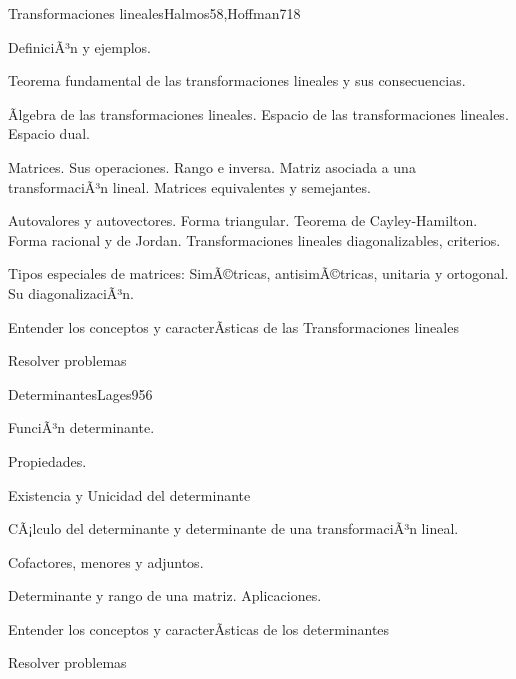 \begin{syllabus}
\begin{unit}{Transformaciones lineales}{Halmos58,Hoffman71}{8}
   \begin{topics}
         \item  DefiniciÃ³n y ejemplos.
	 \item  Teorema fundamental de las transformaciones lineales y sus consecuencias.
         \item  Ãlgebra de las transformaciones lineales. Espacio de las transformaciones lineales. Espacio dual.
	 \item  Matrices. Sus operaciones. Rango e inversa. Matriz asociada a una transformaciÃ³n lineal. Matrices equivalentes y semejantes.
         \item  Autovalores y autovectores. Forma triangular. Teorema de Cayley-Hamilton. Forma racional y de  Jordan. Transformaciones lineales diagonalizables, criterios.
	 \item  Tipos especiales de matrices: SimÃ©tricas, antisimÃ©tricas, unitaria y ortogonal. Su diagonalizaciÃ³n.
   \end{topics}

   \begin{unitgoals}
         \item  Entender los conceptos y caracterÃ­sticas de las Transformaciones lineales
         \item  Resolver problemas
   \end{unitgoals}
\end{unit}

\begin{unit}{Determinantes}{Lages95}{6}
   \begin{topics}
         \item  FunciÃ³n determinante.
	 \item  Propiedades.
         \item  Existencia y Unicidad del determinante
	 \item  CÃ¡lculo del determinante y determinante de una transformaciÃ³n lineal.
         \item  Cofactores, menores y adjuntos.
	\item Determinante y rango de una matriz. Aplicaciones.
   \end{topics}

   \begin{unitgoals}
         \item  Entender los conceptos y caracterÃ­sticas de los determinantes
         \item  Resolver problemas
   \end{unitgoals}
\end{unit}


\end{syllabus}
